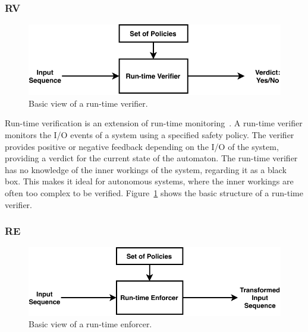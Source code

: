 \subsubsection{\acf{RV}}
\begin{figure}[h]
	\centering
	\includegraphics[width=\textwidth]{Content/fig/RV-basic.pdf}
	\caption{Basic view of a run-time verifier. \label{fig:rvbasic}}
\end{figure}

Run-time verification is an extension of run-time monitoring~\cite{runtime-verify}.
A run-time verifier monitors the I/O events of a system using a specified safety policy.
The verifier provides positive or negative feedback depending on the I/O of the system, providing a verdict for the current state of the automaton.
The run-time verifier has no knowledge of the inner workings of the system, regarding it as a black box.
This makes it ideal for autonomous systems, where the inner workings are often too complex to be verified.
Figure~\ref{fig:rvbasic} shows the basic structure of a run-time verifier.

\subsubsection{\acf{RE}}
\begin{figure}[h]
	\centering
	\includegraphics[width=\textwidth]{Content/fig/RE-basic.pdf}
	\caption{Basic view of a run-time enforcer. \label{fig:rebasic}}
\end{figure}

